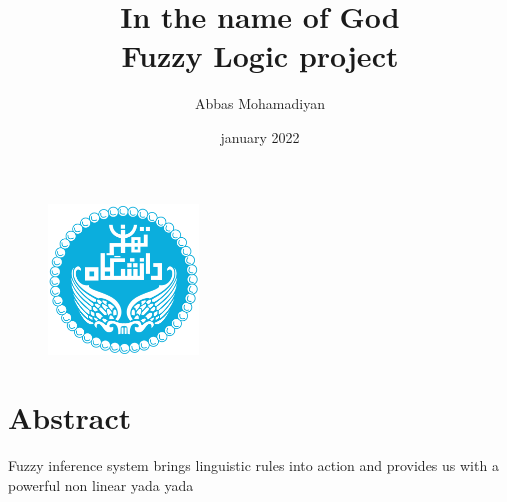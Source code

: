 \documentclass[10pt,A4,english]{report}
\title{In the name of God\\{\Large Fuzzy Logic project}}
\author{Abbas Mohamadiyan}
\date{january 2022}
\begin{document}
\begin{figure}
	\centering
\includegraphics[height = 4cm]{tehranuni}
\end{figure}



\maketitle

\chapter*{Abstract}
Fuzzy inference system brings linguistic rules into action and provides us with a powerful non linear yada yada

\tableofcontents



\end{document}
